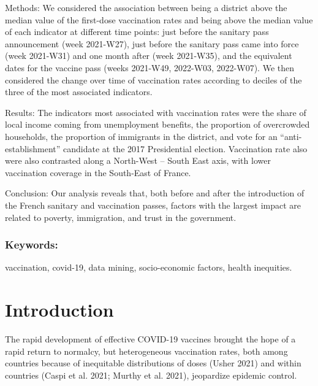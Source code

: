 \documentclass[
]{article}
\begin{document}
Methods: We considered the association between being a district above the median value of the first-dose vaccination rates and being above the median value of each indicator at different time points: just before the sanitary pass announcement (week 2021-W27), just before the sanitary pass came into force (week 2021-W31) and one month after (week 2021-W35), and the equivalent dates for the vaccine pass (weeks 2021-W49, 2022-W03, 2022-W07). We then considered the change over time of vaccination rates according to deciles of the three of the most associated indicators.

Results: The indicators most associated with vaccination rates were the share of local income coming from unemployment benefits, the proportion of overcrowded households, the proportion of immigrants in the district, and vote for an ``anti-establishment'' candidate at the 2017 Presidential election. Vaccination rate also were also contrasted along a North-West -- South East axis, with lower vaccination coverage in the South-East of France.

Conclusion: Our analysis reveals that, both before and after the introduction of the French sanitary and vaccination passes, factors with the largest impact are related to poverty, immigration, and trust in the government.

\hypertarget{keywords}{%
\subsubsection{Keywords:}\label{keywords}}

vaccination, covid-19, data mining, socio-economic factors, health inequities.

\newpage

\hypertarget{introduction}{%
\section{Introduction}\label{introduction}}

The rapid development of effective COVID-19 vaccines brought the hope of a rapid return to normalcy, but heterogeneous vaccination rates, both among countries because of inequitable distributions of doses (Usher 2021) and within countries (Caspi et al. 2021; Murthy et al. 2021), jeopardize epidemic control.
\end{document}
